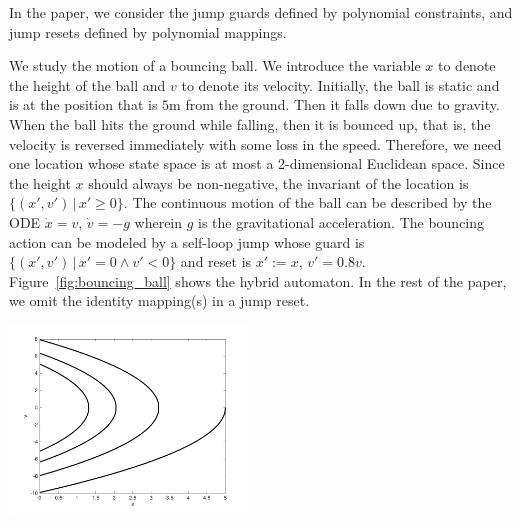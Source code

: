 In the paper, we consider the jump guards defined by polynomial constraints, and jump resets defined by polynomial mappings.

\begin{example}
 We study the motion of a bouncing ball. We introduce the variable $x$ to denote the height of the ball and $v$ to denote its velocity. Initially, the ball is static and is at the position that is $5$m from the ground. Then it falls down due to gravity. When the ball hits the ground while falling, then it is bounced up, that is, the velocity is reversed immediately with some loss in the speed. Therefore, we need one location whose state space is at most a 2-dimensional Euclidean space. Since the height $x$ should always be non-negative, the invariant of the location is $\{(x',v')\,|\,x' \geq 0\}$. The continuous motion of the ball can be described by the ODE $\dot{x} = v$, $\dot{v} = -g$ wherein $g$ is the gravitational acceleration. The bouncing action can be modeled by a self-loop jump whose guard is $\{(x',v')\,|\,x' = 0 \wedge v' < 0\}$ and reset is $x' := x$, $v' = 0.8v$. Figure~\ref{fig:bouncing_ball} shows the hybrid automaton. In the rest of the paper, we omit the identity mapping(s) in a jump reset.
\end{example}

\begin{minipage}{0.48\textwidth}
 \centering
 \label{fig:bouncing_ball}
\end{minipage}
\hspace{1ex}
\begin{minipage}{0.48\textwidth}
 \centering
 \includegraphics[height = 5cm]{images/bouncing_ball}
 \label{fig:execution}
\end{minipage}



